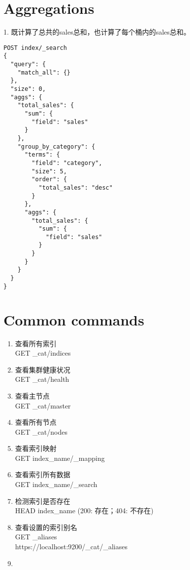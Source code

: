 \documentclass[]{exam}
\begin{document}
\begin{questions}
\section{Aggregations}
1. 既计算了总共的sales总和，也计算了每个桶内的sales总和。
\begin{verbatim}
POST index/_search
{
  "query": {
    "match_all": {}
  },
  "size": 0,
  "aggs": {
    "total_sales": {
      "sum": {
        "field": "sales"
      }
    },
    "group_by_category": {
      "terms": {
        "field": "category",
        "size": 5,
        "order": {
          "total_sales": "desc"
        }
      },
      "aggs": {
        "total_sales": {
          "sum": {
            "field": "sales"
          }
        }
      }
    }
  }
}
\end{verbatim}

\section{Common commands}
\begin{enumerate}
    \item 查看所有索引 \\
    GET \_cat/indices
    \item 查看集群健康状况 \\
    GET \_cat/health
    \item 查看主节点 \\ 
    GET \_cat/master
    \item 查看所有节点 \\ 
    GET \_cat/nodes
    \item 查看索引映射 \\
    GET index\_name/\_mapping
    \item 查看索引所有数据 \\
    GET index\_name/\_search
    \item 检测索引是否存在 \\
    HEAD index\_name (200: 存在；404: 不存在)
    \item 查看设置的索引别名 \\
    GET \_aliases \\
    {https://localhost:9200/\_cat/\_aliases}
    \item 
\end{enumerate}













\end{questions}
\end{document}
